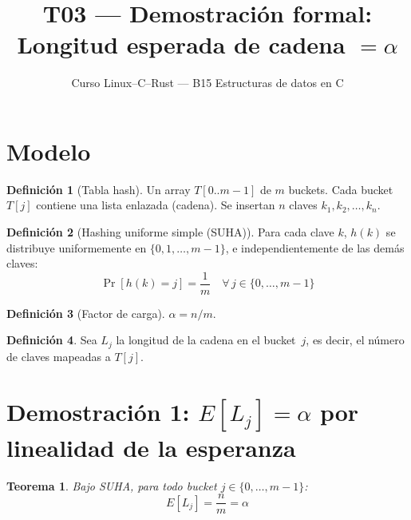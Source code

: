 \documentclass[11pt, letterpaper]{article}
\title{%
  T03 --- Demostración formal:\\[4pt]
  Longitud esperada de cadena $= \alpha$
}
\author{Curso Linux--C--Rust --- B15 Estructuras de datos en C}
\date{}
\theoremstyle{definition}
\newtheorem{definition}{Definición}[section]
\theoremstyle{plain}
\newtheorem{theorem}{Teorema}[section]
\theoremstyle{remark}
\begin{document}
\maketitle
\tableofcontents

\section{Modelo}

\begin{definition}[Tabla hash]
Un array $T[0..m{-}1]$ de $m$ buckets. Cada bucket $T[j]$ contiene
una lista enlazada (cadena). Se insertan $n$ claves
$k_1, k_2, \ldots, k_n$.
\end{definition}

\begin{definition}[Hashing uniforme simple (SUHA)]
Para cada clave $k$, $h(k)$ se distribuye uniformemente en
$\{0, 1, \ldots, m{-}1\}$, e independientemente de las demás claves:
\[
  \Pr[h(k) = j] = \frac{1}{m}
  \quad \forall\, j \in \{0, \ldots, m{-}1\}
\]
\end{definition}

\begin{definition}[Factor de carga]
$\alpha = n/m$.
\end{definition}

\begin{definition}
Sea $L_j$ la longitud de la cadena en el bucket~$j$, es decir, el
número de claves mapeadas a $T[j]$.
\end{definition}

\section{Demostración 1:
  \texorpdfstring{$E[L_j] = \alpha$}{E[Lj] = alpha}
  por linealidad de la esperanza}

\begin{theorem}\label{thm:expected}
Bajo SUHA, para todo bucket $j \in \{0, \ldots, m{-}1\}$:
\[
  E[L_j] = \frac{n}{m} = \alpha
\]
\end{theorem}
\end{document}
